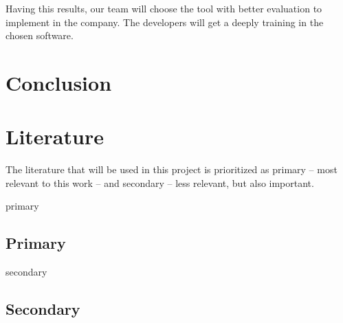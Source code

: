 \documentclass[a4paper]{article}
\begin{document}
Having this results, our team will choose the tool with better evaluation to implement in the company. 
The developers will get a deeply training in the chosen software.

\section{Conclusion}

\newpage
\appendix
\section{Literature}

The literature that will be used in this project is prioritized as primary -- most relevant to this work -- and secondary -- less relevant, but also important. 
\begin{btSect}[alpha]{primary}
\subsection{Primary}
\btPrintAll
\end{btSect}

\begin{btSect}[alpha]{secondary}
\subsection{Secondary}
\btPrintAll
\end{btSect}
\end{document}
